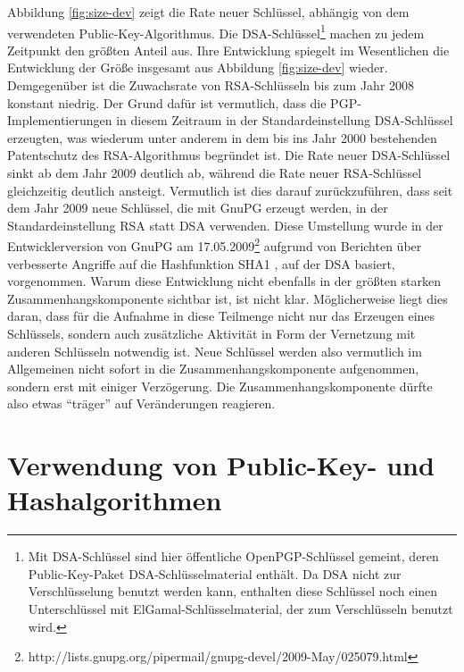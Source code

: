 Abbildung \ref{fig:size-dev} zeigt die Rate neuer Schlüssel,
abhängig von dem verwendeten Public-Key-Algorithmus. Die
DSA-Schlüssel\footnote{Mit DSA-Schlüssel sind hier öffentliche
  OpenPGP-Schlüssel gemeint, deren Public-Key-Paket
  DSA-Schlüsselmaterial enthält. Da DSA nicht zur
  Verschlüsselung benutzt werden kann, enthalten diese Schlüssel
  noch einen Unterschlüssel mit ElGamal-Schlüsselmaterial, der zum
  Verschlüsseln benutzt wird.} machen zu jedem Zeitpunkt den
größten Anteil aus. Ihre Entwicklung spiegelt im Wesentlichen die
Entwicklung der Größe insgesamt aus Abbildung \ref{fig:size-dev}
wieder. Demgegenüber ist die Zuwachsrate von RSA-Schlüsseln bis
zum Jahr 2008 konstant niedrig. Der Grund dafür ist vermutlich, dass
die PGP-Implementierungen in diesem Zeitraum in der
Standardeinstellung DSA-Schlüssel erzeugten, was wiederum unter
anderem in dem bis ins Jahr 2000 bestehenden Patentschutz des
RSA-Algorithmus begründet ist.  Die Rate neuer DSA-Schlüssel sinkt
ab dem Jahr 2009 deutlich ab, während die Rate neuer RSA-Schlüssel
gleichzeitig deutlich ansteigt. Vermutlich ist dies darauf
zurückzuführen, dass seit dem Jahr 2009 neue Schlüssel, die mit
GnuPG erzeugt werden, in der Standardeinstellung RSA statt DSA
verwenden. Diese Umstellung wurde in der Entwicklerversion von GnuPG
am
17.05.2009\footnote{http://lists.gnupg.org/pipermail/gnupg-devel/2009-May/025079.html}
aufgrund von Berichten über verbesserte Angriffe auf die
Hashfunktion SHA1 \cite{McDonald2009}, auf der DSA basiert,
vorgenommen. Warum diese Entwicklung nicht ebenfalls in der größten
starken Zusammenhangskomponente sichtbar ist, ist nicht
klar. Möglicherweise liegt dies daran, dass für die Aufnahme in
diese Teilmenge nicht nur das Erzeugen eines Schlüssels, sondern
auch zusätzliche Aktivität in Form der Vernetzung mit anderen
Schlüsseln notwendig ist. Neue Schlüssel werden also vermutlich im
Allgemeinen nicht sofort in die Zusammenhangskomponente aufgenommen,
sondern erst mit einiger Verzögerung. Die Zusammenhangskomponente
dürfte also etwas ``träger'' auf Veränderungen reagieren.

\section{Verwendung von Public-Key- und Hashalgorithmen}
\label{sec:public-key-und}

